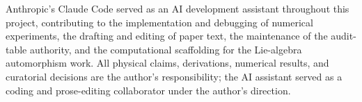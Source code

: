 
\label{sec:acknowledgements}

Anthropic's Claude Code served as an AI development assistant
throughout this project, contributing to the implementation and
debugging of numerical experiments, the drafting and editing of
paper text, the maintenance of the audit-table authority, and the
computational scaffolding for the Lie-algebra automorphism work.
All physical claims, derivations, numerical results, and curatorial
decisions are the author's responsibility; the AI assistant served
as a coding and prose-editing collaborator under the author's
direction.
